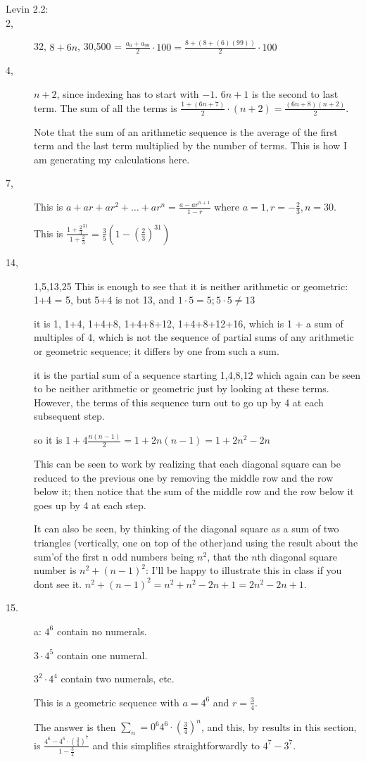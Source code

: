 \documentclass[12pt]{article}
\begin{document}
\begin{description}
\item[Levin 2.2:]

\item[ 2,]  32, $8+6n$, 30,500 = $\frac{a_0+a_99}2\cdot 100 = \frac{8+(8+(6)(99))}2\cdot 100$

\item[ 4,]  $n+2$, since indexing has to start with $-1$.  $6n+1$ is the second to last term.  The sum of all the terms is
$\frac{1 + (6n+7)}2 \cdot (n+2) = \frac{(6n+8)(n+2)}2$.

Note that the sum of an arithmetic sequence is the average of the first term and the last term multiplied by the number of terms.  This is how I am generating my calculations here.

\item[ 7,]   This is $a+ar+ar^2+\ldots+ar^n = \frac{a -ar^{n+1}}{1-r}$ where $a=1, r=-\frac 23, n=30$.

This is $\frac{1+\frac23^{31}}{1+\frac 23} = \frac35(1-(\frac 23)^{31})$

\item[ 14, ]  1,5,13,25  This is enough to see that it is neither arithmetic or geometric:  1+4 = 5, but 5+4 is not 13, and
$1 \cdot 5 = 5; 5 \cdot 5 \neq 13$

it is 1, 1+4, 1+4+8, 1+4+8+12, 1+4+8+12+16, which is 1 + a sum of multiples of 4, which is not
the sequence of partial sums of any arithmetic or geometric sequence; it differs by one from such a sum.

it is the partial sum of a sequence starting 1,4,8,12  which again can be seen to be neither arithmetic or geometric
just by looking at these terms.  However, the terms of this sequence turn out to go up by 4 at each subsequent step.

so it is $1 + 4\frac{n(n-1)}2= 1+2n(n-1) = 1+2n^2-2n$

This can be seen to work by realizing that each diagonal square can be reduced to the previous one by removing the middle row and the row below it;  then notice that the sum of the middle row and the row below it goes up by 4 at each step.

It can also be seen, by thinking of the diagonal square as a sum of two triangles (vertically, one on top of the other)and using the result about the sum'of the first n odd numbers being $n^2$, that the $n$th diagonal square number is $n^2 + (n-1)^2$:  I'll be happy to illustrate this in class if you dont see it.  $n^2+ (n-1)^2  = n^2 + n^2 -2n+1 = 2n^2-2n+1$.

\item[15. ]  a:  $4^6$ contain no numerals.

$3\cdot 4^5$ contain one numeral.

$3^2 \cdot 4^4$ contain two numerals, etc.

This is a geometric sequence with $a=4^6$ and $r=\frac 34$.

The answer is then $\sum_n=0^6 4^6\cdot (\frac34)^n$, and this, by results in this section, is
$\frac{4^6 - 4^6\cdot (\frac 34)^7}{1-\frac 34}$ and this simplifies straightforwardly to $4^7-3^7$.

\end{description}
\end{document}
